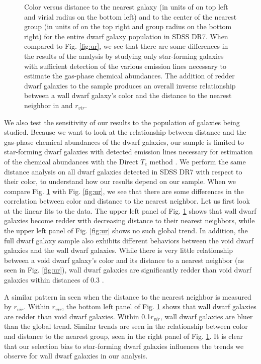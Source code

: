 \begin{figure}
    \caption[Color versus distance of full SDSS dwarf population]{Color versus 
    distance to the nearest galaxy (in units of \hMpc on top left and virial 
    radius on the bottom left) and to the center of the nearest group (in units 
    of \hMpc on the top right and group radius on the bottom right) for the 
    entire dwarf galaxy population in SDSS DR7.  When compared to Fig. 
    \ref{fig:ur}, we see that there are some differences in the results of the 
    analysis by studying only star-forming galaxies with sufficient detection of 
    the various emission lines necessary to estimate the gas-phase chemical 
    abundances.  The addition of redder dwarf galaxies to the sample produces an 
    overall inverse relationship between a wall dwarf galaxy's color and the 
    distance to the nearest neighbor in \hMpc and $r_{vir}$.}
    \label{fig:ur_allDwarf}
\end{figure}

We also test the sensitivity of our results to the population of galaxies being 
studied.  Because we want to look at the relationship between distance and the 
gas-phase chemical abundances of the dwarf galaxies, our sample is limited to 
star-forming dwarf galaxies with detected emission lines necessary for 
estimation of the chemical abundances with the Direct $T_e$ method 
\citep[see][for more details]{Douglass17a}.  We perform the same distance 
analysis on all dwarf galaxies detected in SDSS DR7 with respect to their 
color, to understand how our results depend on our sample.  When we compare Fig. 
\ref{fig:ur_allDwarf} with Fig. \ref{fig:ur}, we see that there are some 
differences in the correlation between color and distance to the nearest 
neighbor.  Let us first look at the linear fits to the data.  The upper left 
panel of Fig. \ref{fig:ur_allDwarf} shows that wall dwarf galaxies become redder 
with decreasing distance to their nearest neighbors, while the upper left panel 
of Fig. \ref{fig:ur} shows no such global trend.  In addition, the full dwarf 
galaxy sample also exhibits different behaviors between the void dwarf galaxies 
and the wall dwarf galaxies.  While there is very little relationship between a 
void dwarf galaxy's color and its distance to a nearest neighbor (as seen in 
Fig. \ref{fig:ur}), wall dwarf galaxies are significantly redder than void dwarf 
galaxies within distances of 0.3 \hMpc.

A similar pattern in seen when the distance to the nearest neighbor is measured 
by $r_{vir}$.  Within $r_{vir}$, the bottom left panel of Fig. 
\ref{fig:ur_allDwarf} shows that wall dwarf galaxies are redder than void dwarf 
galaxies.  Within 0.1$r_{vir}$, wall dwarf galaxies are bluer than the global 
trend.  Similar trends are seen in the relationship between color and distance 
to the nearest group, seen in the right panel of Fig. \ref{fig:ur_allDwarf}.  It 
is clear that our selection bias to star-forming dwarf galaxies influences the 
trends we observe for wall dwarf galaxies in our analysis.

